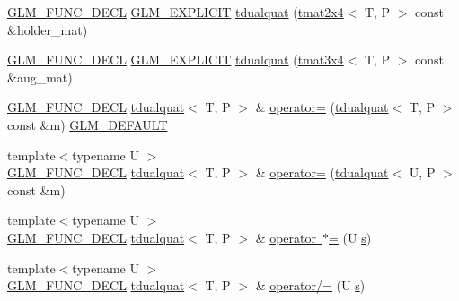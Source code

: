 \begin{DoxyCompactItemize}
\item 
\mbox{\hyperlink{setup_8hpp_ab2d052de21a70539923e9bcbf6e83a51}{G\+L\+M\+\_\+\+F\+U\+N\+C\+\_\+\+D\+E\+CL}} \mbox{\hyperlink{setup_8hpp_a6c74f5a5e7b134ab69023ff9a30d4d5d}{G\+L\+M\+\_\+\+E\+X\+P\+L\+I\+C\+IT}} \mbox{\hyperlink{structglm_1_1tdualquat_a7b6503ed3770426be014ac5aa91d954f}{tdualquat}} (\mbox{\hyperlink{structglm_1_1tmat2x4}{tmat2x4}}$<$ T, P $>$ const \&holder\+\_\+mat)
\item 
\mbox{\hyperlink{setup_8hpp_ab2d052de21a70539923e9bcbf6e83a51}{G\+L\+M\+\_\+\+F\+U\+N\+C\+\_\+\+D\+E\+CL}} \mbox{\hyperlink{setup_8hpp_a6c74f5a5e7b134ab69023ff9a30d4d5d}{G\+L\+M\+\_\+\+E\+X\+P\+L\+I\+C\+IT}} \mbox{\hyperlink{structglm_1_1tdualquat_a826805f42bdbf606ce22f393bfd676f3}{tdualquat}} (\mbox{\hyperlink{structglm_1_1tmat3x4}{tmat3x4}}$<$ T, P $>$ const \&aug\+\_\+mat)
\item 
\mbox{\hyperlink{setup_8hpp_ab2d052de21a70539923e9bcbf6e83a51}{G\+L\+M\+\_\+\+F\+U\+N\+C\+\_\+\+D\+E\+CL}} \mbox{\hyperlink{structglm_1_1tdualquat}{tdualquat}}$<$ T, P $>$ \& \mbox{\hyperlink{structglm_1_1tdualquat_a6481d3d33ee01fda77eb743680bfd8cd}{operator=}} (\mbox{\hyperlink{structglm_1_1tdualquat}{tdualquat}}$<$ T, P $>$ const \&m) \mbox{\hyperlink{setup_8hpp_aefce7051c376a64ba89fa93a9f63bc2c}{G\+L\+M\+\_\+\+D\+E\+F\+A\+U\+LT}}
\item 
{\footnotesize template$<$typename U $>$ }\\\mbox{\hyperlink{setup_8hpp_ab2d052de21a70539923e9bcbf6e83a51}{G\+L\+M\+\_\+\+F\+U\+N\+C\+\_\+\+D\+E\+CL}} \mbox{\hyperlink{structglm_1_1tdualquat}{tdualquat}}$<$ T, P $>$ \& \mbox{\hyperlink{structglm_1_1tdualquat_a88370687edccdd5b6e62c9e314bc95c2}{operator=}} (\mbox{\hyperlink{structglm_1_1tdualquat}{tdualquat}}$<$ U, P $>$ const \&m)
\item 
{\footnotesize template$<$typename U $>$ }\\\mbox{\hyperlink{setup_8hpp_ab2d052de21a70539923e9bcbf6e83a51}{G\+L\+M\+\_\+\+F\+U\+N\+C\+\_\+\+D\+E\+CL}} \mbox{\hyperlink{structglm_1_1tdualquat}{tdualquat}}$<$ T, P $>$ \& \mbox{\hyperlink{structglm_1_1tdualquat_a1a833db2545635834e826336f4d7f276}{operator $\ast$=}} (U \mbox{\hyperlink{glad_8h_af1b1d5edfea6a34daee7389b1b5810ad}{s}})
\item 
{\footnotesize template$<$typename U $>$ }\\\mbox{\hyperlink{setup_8hpp_ab2d052de21a70539923e9bcbf6e83a51}{G\+L\+M\+\_\+\+F\+U\+N\+C\+\_\+\+D\+E\+CL}} \mbox{\hyperlink{structglm_1_1tdualquat}{tdualquat}}$<$ T, P $>$ \& \mbox{\hyperlink{structglm_1_1tdualquat_ab4cdb5a086d64909be52d436bd05ec11}{operator/=}} (U \mbox{\hyperlink{glad_8h_af1b1d5edfea6a34daee7389b1b5810ad}{s}})

\end{DoxyCompactItemize}
